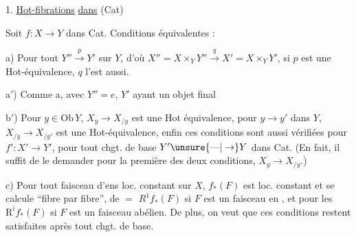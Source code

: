 
1. \uline{Hot-fibrations} \uline{dans} (Cat)

   Soit $f:X\longrightarrow Y$ dans Cat. Conditions équivalentes :

a) Pour tout $Y''\xrightarrow{p}Y'$ sur $Y$, d'où $X''=X\times_Y Y''\xrightarrow{q}X'=X\times_Y Y'$,
si $p$ est une Hot-équivalence, $q$ l'est aussi.

a$'$) Comme a, avec $Y''=e$, $Y'$ ayant un objet final



b$'$) Pour  $y\in\mathrm{Ob}\,Y$, $X_y\to X_{/y}$ est une Hot équivalence,
pour  $y\to y'$ dans $Y$, $X_{/y}\to X_{/y'}$ est une Hot-équivalence,
enfin ces  conditions sont aussi vérifiées
pour $f':X'\to Y'$, pour tout chgt. de base $Y'\unsure{\text{---}|\to}Y$
dans Cat. (En fait, il suffit de le demander pour la première des
deux conditions,  $X_y\to X_{/y}$.)


c) Pour tout faisceau d'ens loc. constant  sur $X$,
$f_*(F)$ est loc. constant et se calcule ``fibre par fibre'',
de $=$  $R^1f_*(F)$ si $F$ est un faisceau en ,
et pour les $\mathrm R^i f_*(F)$ si $F$ est un faisceau abélien. De
plus, on veut que ces conditions restent satisfaites
après tout chgt. de base.



